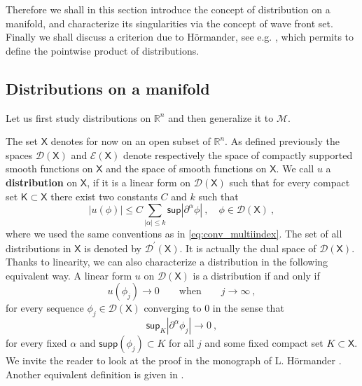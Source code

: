 \documentclass[11pt]{book}
\newcommand{\supp}{\mathsf{supp}}
\renewcommand{\sup}{\mathsf{sup}}
\newcommand{\abs}[1]{\left|#1\right|}
\newcommand{\Dcal}{\mathcal{D}}
\newcommand{\Ecal}{\mathcal{E}}
\newcommand{\Mcal}{\mathcal{M}}
\newcommand{\Rbb}{\mathbb{R}}
\newcommand{\Ksf}{\mathsf{K}}
\newcommand{\Xsf}{\mathsf{X}}
\theoremstyle{break}
\begin{document}
Therefore we shall in this section introduce the concept of distribution on a manifold, and characterize its singularities via the concept of wave front set. Finally we shall discuss a criterion due to Hörmander, see e.g. \cite{hormander_analysis_1990}, which permits to define the pointwise product of distributions.


\subsection{Distributions on a manifold}
\label{p:DISTRIB}


Let us first study distributions on $\Rbb^n$ and then generalize it to $\Mcal$. 


\bigskip


The set $\Xsf$ denotes for now on an open subset of $\Rbb^n$. As defined previously the spaces $\Dcal(\Xsf)$ and $\Ecal(\Xsf)$ denote respectively the space of compactly supported smooth functions on $\Xsf$ and the space of smooth functions on $\Xsf$. We call $u$ a \textbf{distribution} on $\Xsf$, if it is a linear form on $\Dcal(\Xsf)$ such that for every compact set $\Ksf \subset \Xsf$ there exist two constants $C$ and $k$ such that
%
\begin{equation*}
\abs{u(\phi)} \leq C \sum_{\abs{\alpha} \leq k} \sup \abs{\partial^\alpha \phi} \ , \quad \phi \in \Dcal(\Xsf) \ ,
\end{equation*}
%
where we used the same conventions as in \eqref{eq:conv_multiindex}. The set of all distributions in $\Xsf$ is denoted by $\Dcal^\prime(\Xsf)$. It is actually the dual space of $\Dcal(\Xsf)$. Thanks to linearity, we can also characterize a distribution in the following equivalent way. A linear form $u$ on $\Dcal(\Xsf)$ is a distribution if and only if 
%
\begin{equation*}
u(\phi_j) \to 0 \qquad  \mbox{when} \qquad j \to \infty \ ,
\end{equation*}
%
for every sequence $\phi_j \in \Dcal(\Xsf)$ converging to $0$ in the sense that
%
\begin{equation*}
\sup_{K}\abs{\partial^\alpha\phi_j} \to 0 \ ,
\end{equation*}
%
for every fixed $\alpha$ and $\supp(\phi_j) \subset K$ for all $j$ and some fixed compact set $K \subset \Xsf$. We invite the reader to look at the proof in the monograph of L. Hörmander \cite[theorem 2.4]{hormander_analysis_1990}. Another equivalent definition is given in \cite[theorem 2.15]{hormander_analysis_1990}.
\end{document}
